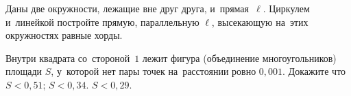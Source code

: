 \begin{problems}
\item
Даны две окружности, лежащие вне друг друга, и~прямая~$\ell$.
Циркулем и~линейкой постройте прямую, параллельную $\ell$, высекающую на~этих
окружностях равные хорды.

\item
Внутри квадрата со~стороной~$1$ лежит фигура (объединение многоугольников)
площади $S$, у~которой нет пары точек на~расстоянии ровно $0{,}001$.
Докажите что
\\
\subproblem $S < 0{,}51$;
\quad
\subproblem $S < 0{,}34$.
\quad
\subproblem $S < 0{,}29$.

\end{problems}

